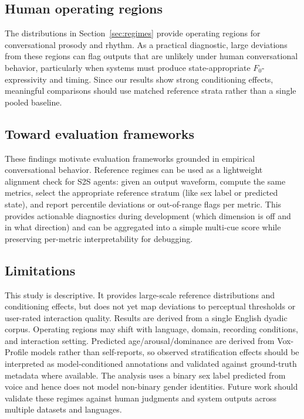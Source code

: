 \documentclass[conference]{IEEEtran}
\begin{document}
\subsection{Human operating regions}\label{sec:operating_regions}
The distributions in Section~\ref{sec:regimes} provide operating regions for conversational prosody and rhythm. 
As a practical diagnostic, large deviations from these regions can flag outputs that are unlikely under human conversational behavior, particularly when systems must produce state-appropriate $F_0$-expressivity and timing. 
Since our results show strong conditioning effects, meaningful comparisons should use matched reference strata rather than a single pooled baseline.

\subsection{Toward evaluation frameworks}\label{sec:toward_frameworks}
These findings motivate evaluation frameworks grounded in empirical conversational behavior. 
Reference regimes can be used as a lightweight alignment check for S2S agents: given an output waveform, compute the same metrics, select the appropriate reference stratum (like sex label or predicted state), and report percentile deviations or out-of-range flags per metric. 
This provides actionable diagnostics during development (which dimension is off and in what direction) and can be aggregated into a simple multi-cue score while preserving per-metric interpretability for debugging.

\subsection{Limitations}\label{sec:limitations}
This study is descriptive. 
It provides large-scale reference distributions and conditioning effects, but does not yet map deviations to perceptual thresholds or user-rated interaction quality. 
Results are derived from a single English dyadic corpus. 
Operating regions may shift with language, domain, recording conditions, and interaction setting. 
Predicted age/arousal/dominance are derived from Vox-Profile models rather than self-reports, so observed stratification effects should be interpreted as model-conditioned annotations and validated against ground-truth metadata where available.
The analysis uses a binary sex label predicted from voice and hence does not model non-binary gender identities.
Future work should validate these regimes against human judgments and system outputs across multiple datasets and languages.
\end{document}
